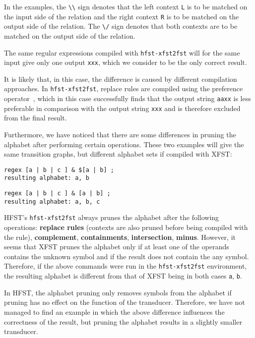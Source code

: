 \documentclass{llncs}
\begin{document}
In the examples, the \verb+\\+ sign denotes that the left context \verb+L+ is to be
matched on the input side of the relation and the right context \verb+R+ is to
be matched on the output side of the relation. The \verb+\/+ sign denotes
that both contexts are to be matched on the output side of the relation.

The same regular expressions compiled with \verb+hfst-xfst2fst+ will for the same
input give only one output \verb+xxx+, which we consider to be the only correct
result.

It is likely that, in this case, the difference is caused by different compilation approaches.
In \verb+hfst-xfst2fst+, replace rules are compiled using the preference
operator~\cite{drobac/2012}, which in this case successfully finds that the output string
\verb+aaxx+ is less preferable in comparison with the output string \verb+xxx+ and 
is therefore excluded from the final result.

Furthermore, we have noticed that there are some differences in pruning the alphabet
after performing certain operations.
These two examples will give the same transition graphs, but different alphabet
sets if compiled with XFST:
\begin{verbatim}
regex [a | b | c ] & $[a | b] ;
resulting alphabet: a, b
\end{verbatim}
\begin{verbatim}
regex [a | b | c ] & [a | b] ;
resulting alphabet: a, b, c
\end{verbatim}

HFST's \verb+hfst-xfst2fst+ always prunes the alphabet after the following operations:
\textbf{replace rules} (contexts are also pruned before being compiled with the
rule), \textbf{complement}, \textbf{containments}, \textbf{intersection},
\textbf{minus}. However, it seems that XFST prunes the alphabet only if at
least one of the operands contains the unknown symbol and if the result does not
contain the any symbol. Therefore, if the above commands were run in the \verb+hfst-xfst2fst+
environment, the resulting alphabet is different from that of XFST being in both cases \verb+a+, \verb+b+.

In HFST, the alphabet pruning only removes symbols from the alphabet if pruning has no effect on the function of the transducer.
Therefore, we have not managed to find an example in which the above difference influences
the correctness of the result, but pruning the alphabet results in a slightly smaller transducer.
\end{document}
